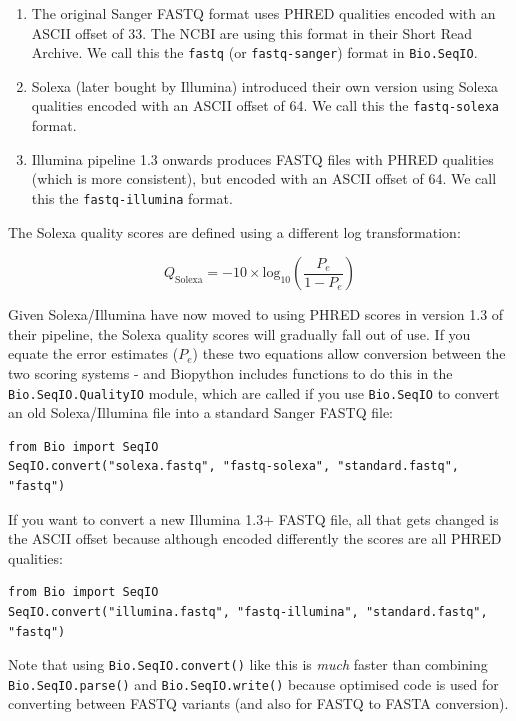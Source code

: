 \documentclass{report}
\begin{document}
\begin{enumerate}
\item The original Sanger FASTQ format uses PHRED qualities encoded with an
ASCII offset of 33. The NCBI are using this format in their Short Read
Archive. We call this the \texttt{fastq} (or \texttt{fastq-sanger}) format
in \verb|Bio.SeqIO|.
\item Solexa (later bought by Illumina) introduced their own version using
Solexa qualities encoded with an ASCII offset of 64. We call this the
\texttt{fastq-solexa} format.
\item Illumina pipeline 1.3 onwards produces FASTQ files with PHRED qualities
(which is more consistent), but encoded with an ASCII offset of 64. We call
this the \texttt{fastq-illumina} format.
\end{enumerate}

The Solexa quality scores are defined using a different log transformation:

\begin{equation}
Q_{\textrm{Solexa}} = - 10 \times \textrm{log}_{10} \left( \frac{P_e}{1-P_e} \right)
\end{equation}

Given Solexa/Illumina have now moved to using PHRED scores in version 1.3 of
their pipeline, the Solexa quality scores will gradually fall out of use.
If you equate the error estimates ($P_e$) these two equations allow conversion
between the two scoring systems - and Biopython includes functions to do this
in the \verb|Bio.SeqIO.QualityIO| module, which are called if you use
\verb|Bio.SeqIO| to convert an old Solexa/Illumina file into a standard Sanger
FASTQ file:

\begin{verbatim}
from Bio import SeqIO
SeqIO.convert("solexa.fastq", "fastq-solexa", "standard.fastq", "fastq")
\end{verbatim}

If you want to convert a new Illumina 1.3+ FASTQ file, all that gets changed
is the ASCII offset because although encoded differently the scores are all
PHRED qualities:

\begin{verbatim}
from Bio import SeqIO
SeqIO.convert("illumina.fastq", "fastq-illumina", "standard.fastq", "fastq")
\end{verbatim}

Note that using \verb|Bio.SeqIO.convert()| like this is \emph{much} faster
than combining \verb|Bio.SeqIO.parse()| and \verb|Bio.SeqIO.write()|
because optimised code is used for converting between FASTQ variants
(and also for FASTQ to FASTA conversion).
\end{document}
